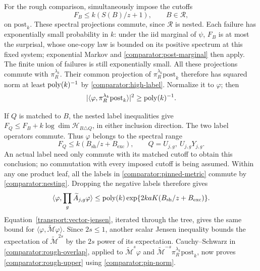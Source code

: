 For the rough comparison, simultaneously impose the cutoffs
\[
 F_B\le k(S(B)/z+1),\qquad B\in\mathcal R,
\]
on $\mathrm{post}_k$.  These spectral projections commute, since
$\mathcal R$ is nested.  Each failure has exponentially small probability
in $k$: under the iid marginal of $\psi$, $F_B$ is at most the
surprisal, whose one-copy law is bounded on its positive spectrum at this
fixed system; exponential Markov and
\eqref{comparator:post-marginal} then apply.  The finite union of failures
is still exponentially small.  All these projections commute with
$\pi_R^{\lambda_k}$.  Their common projection of
$\pi_R^{\lambda_k}\mathrm{post}_k$ therefore has squared norm at least
$\operatorname{poly}(k)^{-1}$ by \eqref{comparator:high-label}.  Normalize it to
$\varphi$; then
\begin{equation}
 |\langle\varphi,\pi_R^{\lambda_k}\mathrm{post}_k\rangle|^2
                         \ge\operatorname{poly}(k)^{-1}.
 \label{comparator:rough-overlap}
\end{equation}

If $Q$ is matched to $B$, the nested label inequalities give
$F_Q\le F_B+k\log\dim\mathcal H_{B\triangle Q}$, in either inclusion
direction.  The two label operators commute.  Thus $\varphi$ belongs to
the spectral range
\begin{equation}
 F_Q\le k(B_{\mathrm{sh}}/z+B_{\mathrm{exc}}),
       \qquad Q=U_{j,g},\ U_{j,g}Y_{j,g}.
 \label{comparator:actual-cutoffs}
\end{equation}
An actual label need only commute with its matched cutoff to obtain this
conclusion; no commutation with every imposed cutoff is being assumed.
Within any one product leaf, all the labels in
\eqref{comparator:pinned-metric} commute by
\eqref{comparator:nesting}.  Dropping the negative labels therefore gives
\[
 \langle\varphi,\prod_g\widetilde A_{j,g}\varphi\rangle
 \le\operatorname{poly}(k)\exp\{2kaK(B_{\mathrm{sh}}/z+B_{\mathrm{exc}})\}.
\]
Equation~\eqref{transport:vector-jensen}, iterated through the tree, gives
the same bound for $\langle\varphi,\widetilde{\mathcal M}\varphi\rangle$.
Since $2s\le1$, another scalar Jensen
inequality bounds the expectation of
$\widetilde{\mathcal M}^{2s}$ by the $2s$ power of its expectation.
Cauchy--Schwarz in \eqref{comparator:rough-overlap}, applied to
$\widetilde{\mathcal M}^{s}\varphi$ and
$\widetilde{\mathcal M}^{-s}\pi_R^{\lambda_k}\mathrm{post}_k$, now proves
\eqref{comparator:rough-upper} using \eqref{comparator:pin-norm}.

